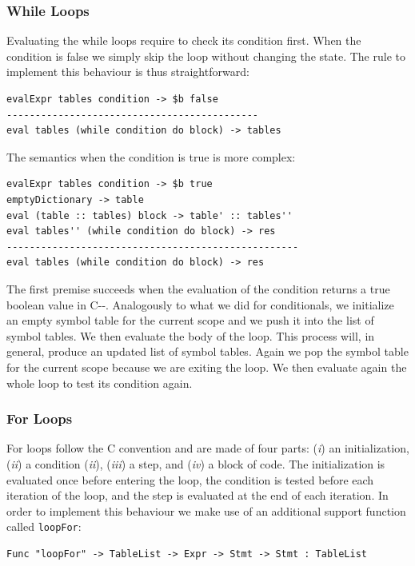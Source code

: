 \subsubsection{While Loops}
\label{subsec:ch_mcnv_languages_cmm_loops}
Evaluating the while loops require to check its condition first. When the condition is false we simply skip the loop without changing the state. The rule to implement this behaviour is thus straightforward:

\begin{lstlisting}
evalExpr tables condition -> $b false
--------------------------------------------
eval tables (while condition do block) -> tables
\end{lstlisting}

\noindent
The semantics when the condition is true is more complex:

\begin{lstlisting}
evalExpr tables condition -> $b true
emptyDictionary -> table
eval (table :: tables) block -> table' :: tables''
eval tables'' (while condition do block) -> res
---------------------------------------------------
eval tables (while condition do block) -> res
\end{lstlisting}

\noindent
The first premise succeeds when the evaluation of the condition returns a true boolean value in C-{}-. Analogously to what we did for conditionals, we initialize an empty symbol table for the current scope and we push it into the list of symbol tables. We then evaluate the body of the loop. This process will, in general, produce an updated list of symbol tables. Again we pop the symbol table for the current scope because we are exiting the loop. We then evaluate again the whole loop to test its condition again.

\subsubsection{For Loops}
For loops follow the C convention and are made of four parts: (\textit{i}) an initialization, (\textit{ii}) a condition (\textit{ii}), (\textit{iii}) a step, and (\textit{iv}) a block of code. The initialization is evaluated once before entering the loop, the condition is tested before each iteration of the loop, and the step is evaluated at the end of each iteration. In order to implement this behaviour we make use of an additional support function called \texttt{loopFor}:

\begin{lstlisting}
Func "loopFor" -> TableList -> Expr -> Stmt -> Stmt : TableList
\end{lstlisting}

